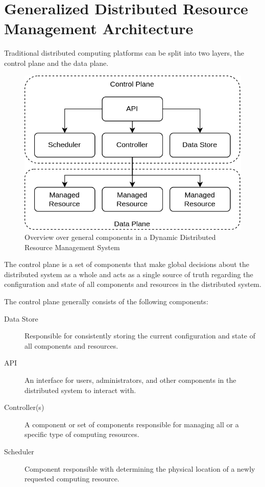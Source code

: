 \section{Generalized Distributed Resource Management Architecture}

Traditional distributed computing platforms can be split into two layers, the
control plane and the data plane.

\begin{figure}[ht]
  \centering
  \includegraphics[width=0.6\linewidth]{resources/dynamic-distributed-resource-management-overview.png}
  \caption{Overview over general components in a Dynamic Distributed Resource Management System}
  \label{fig:ddrms-overview}
\end{figure}

The control plane is a set of components that make global decisions about the
distributed system as a whole and acts as a single source of truth regarding the
configuration and state of all components and resources in the distributed
system.

The control plane generally consists of the following components:

\begin{description}
  \item[Data Store]
    Responsible for consistently storing the current configuration and state of
    all components and resources.
  \item[API]
    An interface for users, administrators, and other components in the
    distributed system to interact with.
  \item[Controller(s)]
    A component or set of components responsible for managing all or a specific
    type of computing resources.
  \item[Scheduler]
    Component responsible with determining the physical location of a newly
    requested computing resource.
\end{description}

